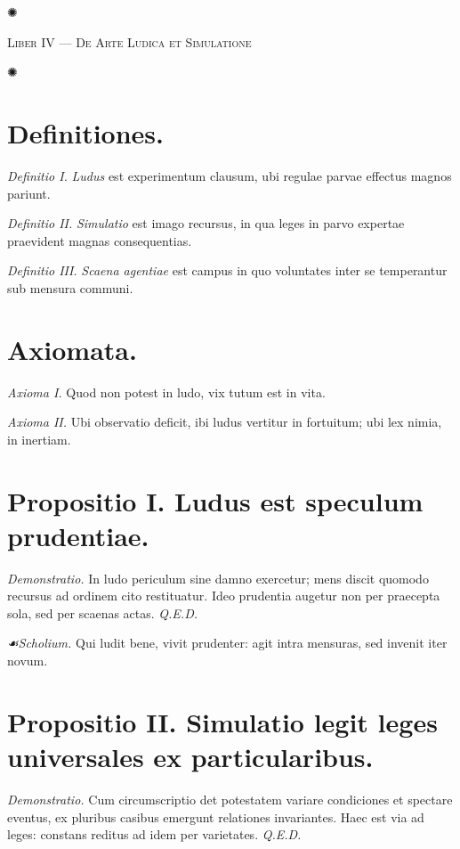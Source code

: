 \documentclass[12pt]{article}
\newcommand{\orn}{\centerline{\large ✺}}
\newcommand{\scholia}{\textit{☙\;}}
\newcommand{\divider}{\vspace{1em}\orn\vspace{1em}}
\newcommand{\Liber}[1]{\vspace{1ex}\begin{center}\Large\textsc{Liber #1}\end{center}\vspace{-0.5ex}\orn\vspace{0.5ex}}
\begin{document}
\divider

\Liber{IV — De Arte Ludica et Simulatione}

\section*{Definitiones.}

\textit{Definitio I.} \; \textit{Ludus} est experimentum clausum, ubi regulae parvae effectus magnos pariunt.

\textit{Definitio II.} \; \textit{Simulatio} est imago recursus, in qua leges in parvo expertae praevident magnas consequentias.

\textit{Definitio III.} \; \textit{Scaena agentiae} est campus in quo voluntates inter se temperantur sub mensura communi.

\section*{Axiomata.}

\textit{Axioma I.} \; Quod non potest in ludo, vix tutum est in vita.

\textit{Axioma II.} \; Ubi observatio deficit, ibi ludus vertitur in fortuitum; ubi lex nimia, in inertiam.

\section*{Propositio I. \; Ludus est speculum prudentiae.}

\textit{Demonstratio.} In ludo periculum sine damno exercetur; mens discit quomodo recursus ad ordinem cito restituatur. Ideo prudentia augetur non per praecepta sola, sed per scaenas actas. \textit{Q.E.D.}

\textit{\scholia Scholium.} Qui ludit bene, vivit prudenter: agit intra mensuras, sed invenit iter novum.

\section*{Propositio II. \; Simulatio legit leges universales ex particularibus.}

\textit{Demonstratio.} Cum circumscriptio det potestatem variare condiciones et spectare eventus, ex pluribus casibus emergunt relationes invariantes. Haec est via ad leges: constans reditus ad idem per varietates. \textit{Q.E.D.}
\end{document}

